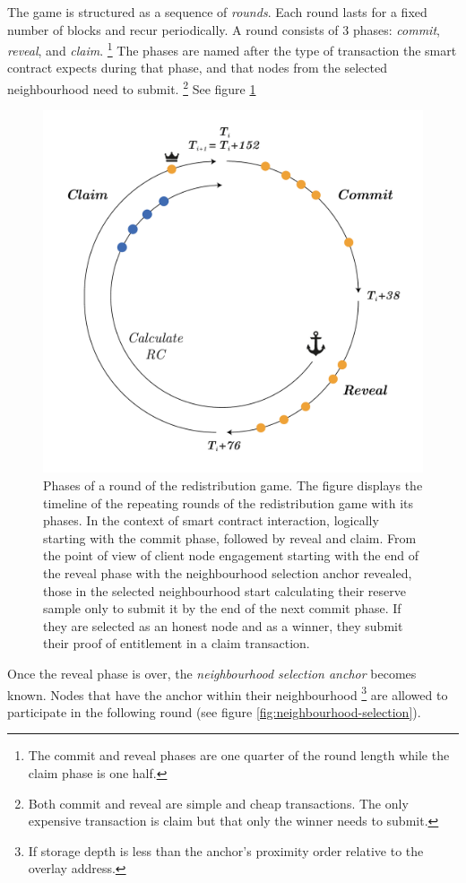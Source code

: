 The game is structured as a sequence of \emph{rounds}. Each round lasts for a fixed number of blocks and recur periodically. A round consists of 3 phases: \emph{commit}, \emph{reveal}, and \emph{claim}.%
%
\footnote{The commit and reveal phases are one quarter of the round length while the claim phase is one half.
}
%
The phases are named after the type of transaction the smart contract expects during that phase, and that nodes from the selected neighbourhood need to submit.%
%
\footnote{Both commit and reveal are simple and cheap transactions. The only expensive transaction is claim but that only the winner needs to submit.}
%
See figure \ref{fig:phases}

\begin{figure}[!ht]
  \centering
    \includegraphics[width=.5\textwidth]{fig/round lifecycle copy.pdf}
  \caption[Phases of a round of the redistribution game]{Phases of a round of the redistribution game. The figure displays the timeline of the repeating rounds of the redistribution game with its phases. In the context of smart contract interaction, logically starting with the commit phase, followed by reveal and claim. From the point of view of client node engagement starting with the end of the reveal phase with the neighbourhood selection anchor revealed, those in the selected neighbourhood start calculating their reserve sample only to submit it by the end of the next commit phase. If they are selected as an honest node and as a winner, they submit their proof of entitlement in a claim transaction.}
\label{fig:phases}
\end{figure}    

Once the reveal phase is over, the  \emph{neighbourhood selection anchor} becomes known. Nodes that have the anchor within their neighbourhood%
%
\footnote{If storage depth is less than the anchor's proximity order relative to the overlay address.}
%
are  allowed to participate in the following round (see figure \ref{fig:neighbourhood-selection}).



